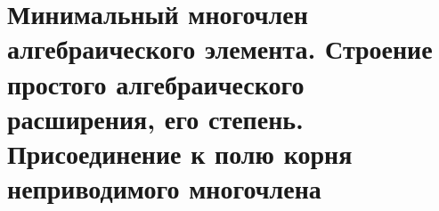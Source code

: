 \section{Минимальный многочлен алгебраического элемента. Строение простого алгебраического расширения, его степень. Присоединение к полю корня неприводимого многочлена}
